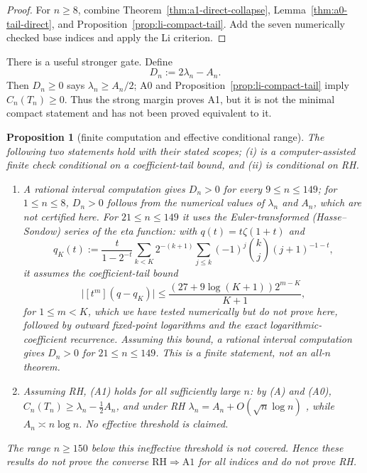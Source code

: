 \documentclass[11pt]{amsart}
\newtheorem{proposition}[theorem]{Proposition}
\theoremstyle{definition}
\theoremstyle{remark}
\theoremstyle{definition}
\newcommand{\RH}{\mathrm{RH}}
\begin{document}
\begin{proof}
For $n\ge8$, combine Theorem~\ref{thm:a1-direct-collapse},
Lemma~\ref{thm:a0-tail-direct}, and Proposition~\ref{prop:li-compact-tail}.  Add the seven numerically
checked base indices and apply the Li criterion.
\end{proof}

There is a useful stronger gate.  Define
\[
 D_n:=2\lambda_n-A_n.
\]
Then $D_n\ge0$ says $\lambda_n\ge A_n/2$; A0 and
Proposition~\ref{prop:li-compact-tail} imply $C_n(T_n)\ge0$.  Thus the strong margin proves A1,
but it is not the minimal compact statement and has not been proved equivalent to it.

\begin{proposition}[finite computation and effective conditional range]\label{prop:a1-finite-conditional}
The following two statements hold with their stated scopes; (i) is a computer-assisted
finite check conditional on a coefficient-tail bound, and (ii) is conditional on RH.
\begin{enumerate}[label=\textup{(\roman*)}]
\item A rational interval computation gives $D_n>0$ for every $9\le n\le149$; for $1\le n\le8$,
$D_n>0$ follows from the numerical values of $\lambda_n$ and $A_n$, which are not certified here.  For
$21\le n\le149$ it uses the Euler-transformed (Hasse--Sondow) series of the eta function: with
$q(t)=t\zeta(1+t)$ and
\[
 q_K(t):=\frac{t}{1-2^{-t}}\sum_{k<K}2^{-(k+1)}\sum_{j\le k}(-1)^j\binom kj(j+1)^{-1-t},
\]
it assumes the coefficient-tail bound
\[
 \bigl|[t^m](q-q_K)\bigr|
 \le\frac{(27+9\log(K+1))2^{m-K}}{K+1},
\]
for $1\le m<K$, which we have tested numerically but do not prove here, followed by outward
fixed-point logarithms and the exact logarithmic-coefficient recurrence.  Assuming this bound, a
rational interval computation gives $D_n>0$ for $21\le n\le149$.  This is a finite statement, not
an all-$n$ theorem.
\item Assuming RH, (A1) holds for all sufficiently large $n$: by (A) and (A0),
$C_n(T_n)\ge\lambda_n-\tfrac12A_n$, and under RH $\lambda_n=A_n+O(\sqrt n\log n)$
\cite[(1.18)]{Lagarias2007}, while $A_n\asymp n\log n$.  No effective threshold is claimed.
\end{enumerate}
The range $n\ge150$ below this ineffective threshold is not covered.  Hence these results do not prove the converse
$\RH\Rightarrow\mathrm{A1}$ for all indices and do not prove RH.
\end{proposition}
\end{document}
